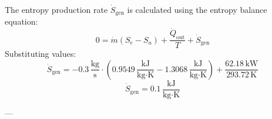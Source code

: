 The entropy production rate \( \dot{S}_{\text{gen}} \) is calculated using the entropy balance equation:  
\[
0 = \dot{m}(S_e - S_a) + \frac{\dot{Q}_{\text{out}}}{T} + \dot{S}_{\text{gen}}
\]  
Substituting values:  
\[
\dot{S}_{\text{gen}} = -0.3 \, \frac{\text{kg}}{\text{s}} \cdot (0.9549 \, \frac{\text{kJ}}{\text{kg·K}} - 1.3068 \, \frac{\text{kJ}}{\text{kg·K}}) + \frac{62.18 \, \text{kW}}{293.72 \, \text{K}}
\]  
\[
\dot{S}_{\text{gen}} = 0.1 \, \frac{\text{kJ}}{\text{kg·K}}
\]  

---
